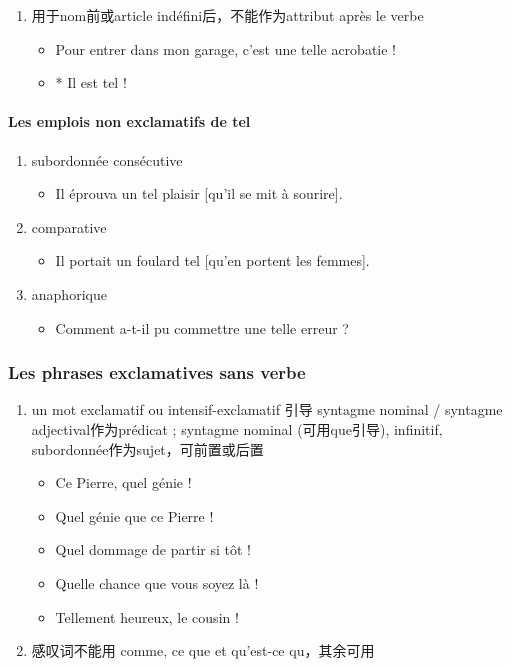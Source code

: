 \documentclass[UTF8]{report}
\begin{document}
\begin{enumerate}
    \item 用于nom前或article indéfini后，不能作为attribut après le verbe
    \begin{itemize}
        \item Pour entrer dans mon garage, c’est une telle acrobatie ! 
        \item * Il est tel !
    \end{itemize}
\end{enumerate}

\paragraph{Les emplois non exclamatifs de tel}

\begin{enumerate}
    \item subordonnée consécutive
    \begin{itemize}
        \item Il éprouva un tel plaisir [qu’il se mit à sourire].
    \end{itemize}
    \item comparative
    \begin{itemize}
        \item Il portait un foulard tel [qu’en portent les femmes].
    \end{itemize}
    \item anaphorique
    \begin{itemize}
        \item Comment a-t-il pu commettre une telle erreur ?
    \end{itemize}
\end{enumerate}

\subsubsection{Les phrases exclamatives sans verbe}
\begin{enumerate}
    \item un mot exclamatif ou intensif-exclamatif 引导 syntagme nominal / syntagme adjectival作为prédicat ; syntagme nominal (可用que引导), infinitif, subordonnée作为sujet，可前置或后置
    \begin{itemize}
        \item Ce Pierre, quel génie !
        \item Quel génie que ce Pierre !
        \item Quel dommage de partir si tôt !
        \item Quelle chance que vous soyez là !
        \item Tellement heureux, le cousin !
    \end{itemize}
    \item 感叹词不能用 comme, ce que et qu’est-ce qu，其余可用
\end{enumerate}
\end{document}

